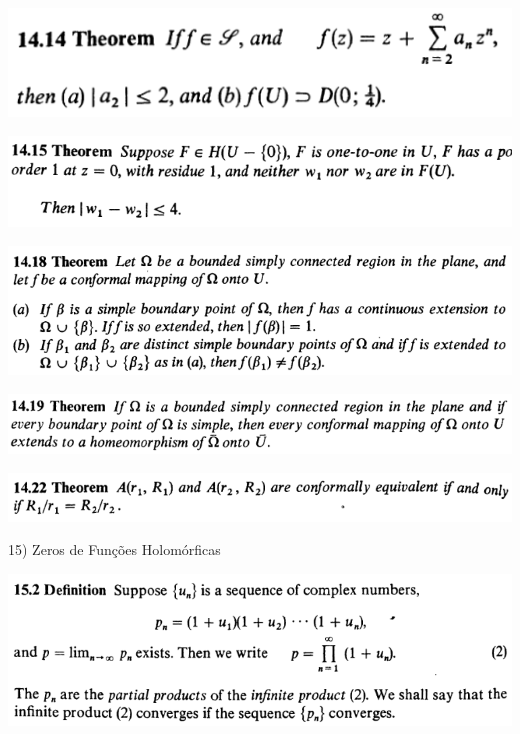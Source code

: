 \documentclass[12pt]{article}
\begin{document}
		\begin{center}
		\includegraphics{14ponto14}
		\end{center}

		\begin{center}
		\includegraphics{14ponto15}
		\end{center}

		\begin{center}
		\includegraphics{14ponto18}
		\end{center}

		\begin{center}
		\includegraphics{14ponto19}
		\end{center}

		\begin{center}
		\includegraphics{14ponto22}
		\end{center}

\vspace{3mm}

15) Zeros de Fun\c{c}\~oes Holom\'orficas

\vspace{3mm}

		\begin{center}
		\includegraphics{d15ponto2}
		\end{center}
\end{document}
